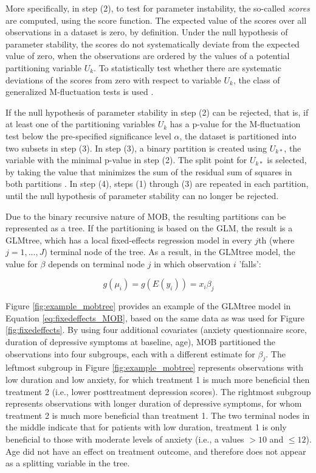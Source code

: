 \documentclass[nobf,doc]{apa}
\begin{document}
More specifically, in step (2), to test for parameter instability, the so-called \textit{scores} are computed, using the score function. The expected value of the scores over all observations in a dataset is zero, by definition. Under the null hypothesis of parameter stability, the scores do not systematically deviate from the expected value of zero, when the observations are ordered by the values of a potential partitioning variable $U_k$. To statistically test whether there are systematic deviations of the scores from zero with respect to variable $U_k$, the class of generalized M-fluctuation tests is used \cite{Zeil05,ZeilyHorn07}.  

If the null hypothesis of parameter stability in step (2) can be rejected, that is, if at least one of the partitioning variables $U_{k}$ has a p-value for the M-fluctuation test below the pre-specified significance level $\alpha$, the dataset is partitioned into two subsets in step (3). In step (3), a binary partition is created using $U_{k*}$, the variable with the minimal p-value in step (2). The split point for $U_{k*}$ is selected, by taking the value that minimizes the sum of the residual sum of squares in both partitions \cite{ZeilyHoth08}. In step (4), steps (1) through (3) are repeated in each partition, until the null hypothesis of parameter stability can no longer be rejected.

Due to the binary recursive nature of MOB, the resulting partitions can be represented as a tree. If the partitioning is based on the GLM, the result is a GLMtree, which has a local fixed-effects regression model in every $j$th (where $j = 1,...,J$) terminal node of the tree. As a result, in the GLMtree model, the value for $\beta$ depends on terminal node $j$ in which observation $i$ 'falls':

\begin{equation}
\label{eq:fixedeffects_MOB}
	g(\mu_{i}) = g(E(y_{i})) = x_{i}\beta_{j}
\end{equation}

Figure \ref{fig:example_mobtree} provides an example of the GLMtree model in Equation \ref{eq:fixedeffects_MOB}, based on the same data as was used for Figure \ref{fig:fixedeffects}. By using four additional covariates (anxiety questionnaire score, duration of depressive symptoms at baseline, age), MOB partitioned the observations into four subgroups, each with a different estimate for $\beta_j$. The leftmost subgroup in Figure \ref{fig:example_mobtree} represents observations with low duration and low anxiety, for which treatment 1 is much more beneficial then treatment 2 (i.e., lower posttreatment depression scores). The rightmost subgroup represents observations with longer duration of depressive symptoms, for whom treatment 2 is much more beneficial than treatment 1. The two terminal nodes in the middle indicate that for patients with low duration, treatment 1 is only beneficial to those with moderate levels of anxiety (i.e., a values $>10$ and $\leq 12$). Age did not have an effect on treatment outcome, and therefore does not appear as a splitting variable in the tree.
\end{document}
